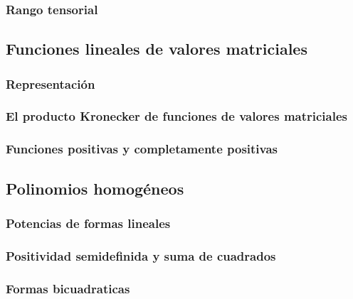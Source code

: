 \subsubsection{Rango tensorial} %
\label{ssub:rango_tensorial}

\subsection{Funciones lineales de valores matriciales} %
\label{sub:funciones_lineales_de_valores_matriciales}

\subsubsection{Representación} %
\label{ssub:representacion}

\subsubsection{El producto Kronecker de funciones de valores matriciales} %
\label{ssub:el_producto_kronecker_de_funciones_de_valores_matriciales}

\subsubsection{Funciones positivas y completamente positivas} %
\label{ssub:funciones_positivas_y_completamente_positivas}

\subsection{Polinomios homogéneos} %
\label{sub:polinomios_homogeneos}

\subsubsection{Potencias de formas lineales} %
\label{ssub:potencias_de_formas_lineales}

\subsubsection{Positividad semidefinida y suma de cuadrados} %
\label{ssub:positividad_semidefinida_y_suma_de_cuadrados}

\subsubsection{Formas bicuadraticas} %
\label{ssub:formas_bicuadraticas}


